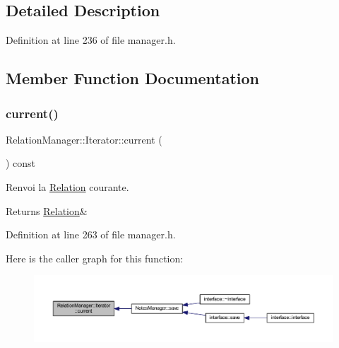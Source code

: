 \subsection{Detailed Description}


Definition at line 236 of file manager.\+h.



\subsection{Member Function Documentation}
\mbox{\label{class_relation_manager_1_1_iterator_a7933bc6a58564cdec8d0641b112e7856}} 
\subsubsection{\texorpdfstring{current()}{current()}}
{\footnotesize\ttfamily Relation\+Manager\+::\+Iterator\+::current (\begin{DoxyParamCaption}{ }\end{DoxyParamCaption}) const\hspace{0.3cm}{\ttfamily [inline]}}



Renvoi la \hyperlink{class_relation}{Relation} courante. 

\begin{DoxyReturn}{Returns}
\hyperlink{class_relation}{Relation}\& 
\end{DoxyReturn}


Definition at line 263 of file manager.\+h.

Here is the caller graph for this function\+:\nopagebreak
\begin{figure}[H]
\begin{center}
\leavevmode
\includegraphics[width=350pt]{class_relation_manager_1_1_iterator_a7933bc6a58564cdec8d0641b112e7856_icgraph}
\end{center}
\end{figure}
\mbox{\label{class_relation_manager_1_1_iterator_a085af111a011f8f1592202cb53132f4c}} 
